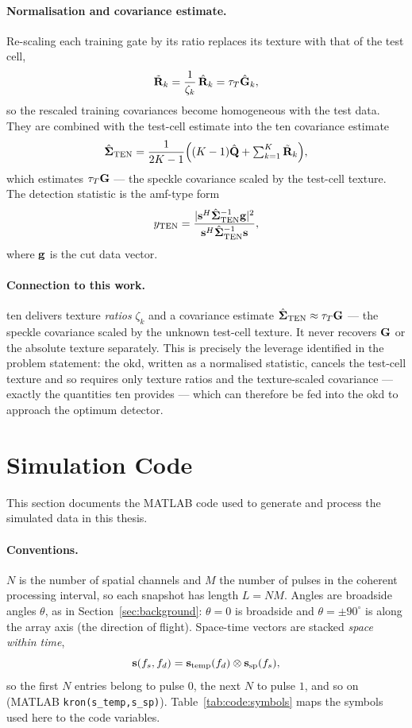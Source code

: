 \documentclass{article}
\begin{document}
\paragraph{Normalisation and covariance estimate.}
Re-scaling each training gate by its ratio replaces its texture with that of the test cell,
$$\tilde{\mathbf{R}}_k=\frac{1}{\zeta_k}\,\hat{\mathbf{R}}_k=\tau_T\hat{\mathbf{G}}_k,$$
so the rescaled training covariances become homogeneous with the test data. They are combined with the test-cell estimate into the \gls{ten} covariance estimate
$$\hat{\mathbf{\Sigma}}_{\text{TEN}}=\frac{1}{2K-1}
   \Big((K-1)\hat{\mathbf{Q}}+\textstyle\sum_{k=1}^{K}\tilde{\mathbf{R}}_k\Big),$$
which estimates $\tau_T\mathbf{G}$ --- the speckle covariance scaled by the test-cell texture. The detection statistic is the \gls{amf}-type form
$$y_{\text{TEN}}=\frac{|\vb s^H\hat{\mathbf{\Sigma}}_{\text{TEN}}^{-1}\vb g|^2}
   {\vb s^H\hat{\mathbf{\Sigma}}_{\text{TEN}}^{-1}\vb s},$$
where $\vb g$ is the \gls{cut} data vector.

\paragraph{Connection to this work.}
\gls{ten} delivers texture \emph{ratios} $\zeta_k$ and a covariance estimate $\hat{\mathbf{\Sigma}}_{\text{TEN}}\approx\tau_T\mathbf{G}$ --- the speckle covariance scaled by the unknown test-cell texture. It never recovers $\mathbf{G}$ or the absolute texture separately. This is precisely the leverage identified in the problem statement: the \gls{okd}, written as a normalised statistic, cancels the test-cell texture and so requires only texture ratios and the texture-scaled covariance --- exactly the quantities \gls{ten} provides --- which can therefore be fed into the \gls{okd} to approach the optimum detector.

\newpage
\section{Simulation Code}\label{sec:code}

This section documents the MATLAB code used to generate and process the simulated data in this thesis.

\paragraph{Conventions.} $N$ is the number of spatial channels and $M$ the number of pulses in the coherent processing interval, so each snapshot has length $L=NM$. Angles are broadside angles $\theta$, as in Section~\ref{sec:background}: $\theta=0$ is broadside and $\theta=\pm90^\circ$ is along the array axis (the direction of flight). Space-time vectors are stacked \emph{space within time},
\[
  \vb s(f_s,f_d) = \vb s_\text{temp}(f_d)\otimes\vb s_\text{sp}(f_s),
\]
so the first $N$ entries belong to pulse $0$, the next $N$ to pulse $1$, and so on (MATLAB \texttt{kron(s\_temp,s\_sp)}). Table~\ref{tab:code:symbols} maps the symbols used here to the code variables.
\end{document}
